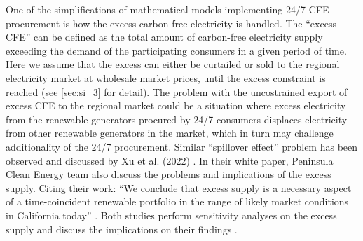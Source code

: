 One of the simplifications of mathematical models implementing 24/7 CFE procurement is how the excess carbon-free electricity is handled. 
The \enquote{excess CFE} can be defined as the total amount of carbon-free electricity supply exceeding the demand of the participating consumers in a given period of time.
Here we assume that the excess can either be curtailed or sold to the regional electricity market at wholesale market prices, until the excess constraint is reached (see \cref{sec:si_3} for detail).
The problem with the uncostrained export of excess CFE to the regional market could be a situation where excess electricity from the renewable generators procured by 24/7 consumers displaces electricity from other renewable generators in the market, which in turn may challenge additionality of the 24/7 procurement. 
Similar \enquote{spillover effect} problem has been observed and discussed by Xu et al. (2022) \cite{xu-247CFE-SSRN}.
In their white paper, Peninsula Clean Energy team also discuss the problems and implications of the excess supply. Citing their work: \enquote{We conclude that excess supply is a necessary aspect of a time-coincident renewable portfolio in the range of likely market conditions in California today} \cite{peninsula-report247}.
Both studies perform sensitivity analyses on the excess supply and discuss the implications on their findings \cite{xu-247CFE-SSRN, peninsula-report247}.
